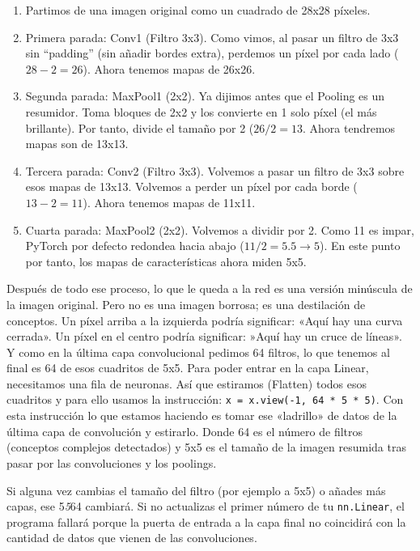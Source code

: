 \documentclass[a4paper,11pt]{article}
\begin{document}
\begin{enumerate}
\def\labelenumi{\arabic{enumi}.}
\setcounter{enumi}{-1}
\item
  Partimos de una imagen original como un cuadrado de 28x28 píxeles.
\item
  Primera parada: Conv1 (Filtro 3x3). Como vimos, al pasar un filtro de
  3x3 sin ``padding'' (sin añadir bordes extra), perdemos un píxel por
  cada lado (\(28-2=26\)). Ahora tenemos mapas de 26x26.
\item
  Segunda parada: MaxPool1 (2x2). Ya dijimos antes que el Pooling es un
  resumidor. Toma bloques de 2x2 y los convierte en 1 solo píxel (el más
  brillante). Por tanto, divide el tamaño por 2 (\(26/2=13\). Ahora
  tendremos mapas son de 13x13.
\item
  Tercera parada: Conv2 (Filtro 3x3). Volvemos a pasar un filtro de 3x3
  sobre esos mapas de 13x13. Volvemos a perder un píxel por cada borde
  (\(13-2=11\)). Ahora tenemos mapas de 11x11.
\item
  Cuarta parada: MaxPool2 (2x2). Volvemos a dividir por 2. Como 11 es
  impar, PyTorch por defecto redondea hacia abajo
  (\(11/2=5.5 \rightarrow 5\)). En este punto por tanto, los mapas de
  características ahora miden 5x5.
\end{enumerate}

Después de todo ese proceso, lo que le queda a la red es una versión
minúscula de la imagen original. Pero no es una imagen borrosa; es una
destilación de conceptos. Un píxel arriba a la izquierda podría
significar: «Aquí hay una curva cerrada». Un píxel en el centro podría
significar: »Aquí hay un cruce de líneas». Y como en la última capa
convolucional pedimos 64 filtros, lo que tenemos al final es 64 de esos
cuadritos de 5x5. Para poder entrar en la capa Linear, necesitamos una
fila de neuronas. Así que estiramos (Flatten) todos esos cuadritos y
para ello usamos la instrucción:
\texttt{x\ =\ x.view(-1,\ 64\ *\ 5\ *\ 5)}. Con esta instrucción lo que
estamos haciendo es tomar ese «ladrillo» de datos de la última capa de
convolución y estirarlo. Donde 64 es el número de filtros (conceptos
complejos detectados) y 5x5 es el tamaño de la imagen resumida tras
pasar por las convoluciones y los poolings.

Si alguna vez cambias el tamaño del filtro (por ejemplo a 5x5) o añades
más capas, ese 5\emph{5}64 cambiará. Si no actualizas el primer número
de tu \texttt{nn.Linear}, el programa fallará porque la puerta de
entrada a la capa final no coincidirá con la cantidad de datos que
vienen de las convoluciones.
\end{document}
